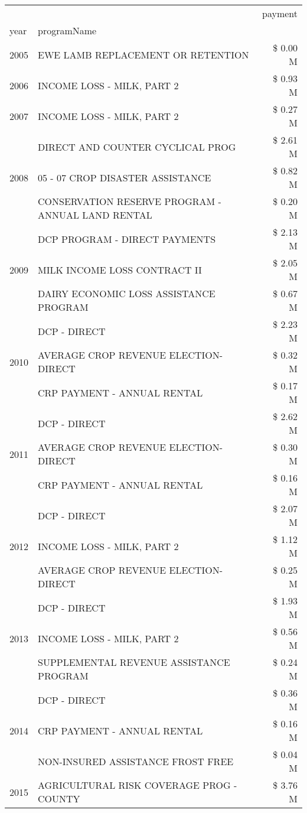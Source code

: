 \begin{tabular}{llr}
\toprule
 &  & payment \\
year & programName &  \\
\midrule
2005 & EWE LAMB REPLACEMENT OR RETENTION & \$ 0.00 M \\
\cline{1-3}
2006 & INCOME LOSS - MILK, PART 2 & \$ 0.93 M \\
\cline{1-3}
2007 & INCOME LOSS - MILK, PART 2 & \$ 0.27 M \\
\cline{1-3}
\multirow[t]{3}{*}{2008} & DIRECT AND COUNTER CYCLICAL PROG & \$ 2.61 M \\
 & 05 - 07 CROP DISASTER ASSISTANCE & \$ 0.82 M \\
 & CONSERVATION RESERVE PROGRAM - ANNUAL LAND RENTAL & \$ 0.20 M \\
\cline{1-3}
\multirow[t]{3}{*}{2009} & DCP PROGRAM - DIRECT PAYMENTS & \$ 2.13 M \\
 & MILK INCOME LOSS CONTRACT II & \$ 2.05 M \\
 & DAIRY ECONOMIC LOSS ASSISTANCE PROGRAM & \$ 0.67 M \\
\cline{1-3}
\multirow[t]{3}{*}{2010} & DCP - DIRECT & \$ 2.23 M \\
 & AVERAGE CROP REVENUE ELECTION-DIRECT & \$ 0.32 M \\
 & CRP PAYMENT - ANNUAL RENTAL & \$ 0.17 M \\
\cline{1-3}
\multirow[t]{3}{*}{2011} & DCP - DIRECT & \$ 2.62 M \\
 & AVERAGE CROP REVENUE ELECTION-DIRECT & \$ 0.30 M \\
 & CRP PAYMENT - ANNUAL RENTAL & \$ 0.16 M \\
\cline{1-3}
\multirow[t]{3}{*}{2012} & DCP - DIRECT & \$ 2.07 M \\
 & INCOME LOSS - MILK, PART 2 & \$ 1.12 M \\
 & AVERAGE CROP REVENUE ELECTION-DIRECT & \$ 0.25 M \\
\cline{1-3}
\multirow[t]{3}{*}{2013} & DCP - DIRECT & \$ 1.93 M \\
 & INCOME LOSS - MILK, PART 2 & \$ 0.56 M \\
 & SUPPLEMENTAL REVENUE ASSISTANCE PROGRAM & \$ 0.24 M \\
\cline{1-3}
\multirow[t]{3}{*}{2014} & DCP - DIRECT & \$ 0.36 M \\
 & CRP PAYMENT - ANNUAL RENTAL & \$ 0.16 M \\
 & NON-INSURED ASSISTANCE FROST FREE & \$ 0.04 M \\
\cline{1-3}
\multirow[t]{3}{*}{2015} & AGRICULTURAL RISK COVERAGE PROG - COUNTY & \$ 3.76 M \\

\end{tabular}

